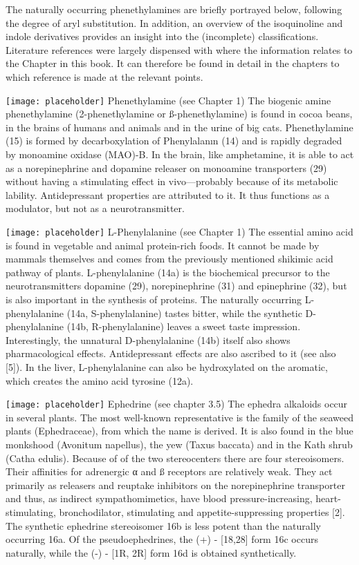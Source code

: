 The naturally occurring phenethylamines are briefly portrayed below, following the degree of aryl substitution. In addition, an overview of the isoquinoline and indole derivatives provides an insight into the (incomplete) classifications. Literature references were largely dispensed with where the information relates to the Chapter in this book. It can therefore be found in detail in the chapters to which reference is made at the relevant points.

\clearpage

\texttt{[image: placeholder]}
Phenethylamine (see Chapter 1) The biogenic amine phenethylamine (2-phenethylamine or ß-phenethylamine) is found in cocoa beans, in the brains of humans and animals and in the urine of big cats. Phenethylamine (15) is formed by decarboxylation of
Phenylalanın (14) and is rapidly degraded by monoamine oxidase (MAO)-B. In the brain, like amphetamine, it is able to act as a norepinephrine and dopamine releaser on monoamine transporters (29) without having a stimulating effect in vivo—probably because of its metabolic lability. Antidepressant properties are attributed to it. It thus functions as a modulator, but not as a neurotransmitter.
\bigbreak

\texttt{[image: placeholder]}
L-Phenylalanine (see Chapter 1) The essential amino acid is found in vegetable and animal protein-rich foods. It cannot be made by mammals themselves and comes from the previously mentioned shikimic acid pathway of plants. L-phenylalanine (14a) is the biochemical precursor to the neurotransmitters dopamine (29), norepinephrine (31) and epinephrine (32), but is also important in the synthesis of proteins. The naturally occurring L-phenylalanine (14a, S-phenylalanine) tastes bitter, while the synthetic D-phenylalanine (14b, R-phenylalanine) leaves a sweet taste impression. Interestingly, the unnatural D-phenylalanine (14b) itself also shows pharmacological effects. Antidepressant effects are also ascribed to it (see also [5]). In the liver, L-phenylalanine can also be hydroxylated on the aromatic, which creates the amino acid tyrosine (12a).
\bigbreak

\texttt{[image: placeholder]}
Ephedrine (see chapter 3.5) The ephedra alkaloids occur in several plants. The most well-known representative is the family of the seaweed plants (Ephedraceae), from which the name is derived. It is also found in the blue monkshood (Avonitum napellus), the yew (Taxus baccata) and in the Kath shrub (Catha edulis). Because of of the two stereocenters there are four stereoisomers. Their affinities for adrenergic α and ß receptors are relatively weak.
They act primarily as releasers and reuptake inhibitors on the norepinephrine transporter and thus, as indirect sympathomimetics, have blood pressure-increasing, heart-stimulating, bronchodilator, stimulating and appetite-suppressing properties [2]. The synthetic ephedrine stereoisomer 16b is less potent than the naturally occurring 16a. Of the pseudoephedrines, the (+) - [18,28] form 16c occurs naturally, while the (-) - [1R, 2R] form 16d is obtained synthetically.
\clearpage

